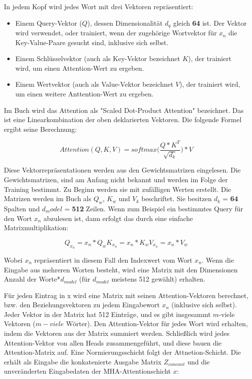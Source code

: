 In jedem Kopf wird jedes Wort mit drei Vektoren repräsentiert:
\begin{itemize}
	\item Einem Query-Vektor ($Q$), dessen Dimensionalität $d_q$ gleich \textbf{64} ist. Der Vektor wird verwendet, oder trainiert, wenn der zugehörige Wortvektor für $x_n$ die Key-Value-Paare gesucht sind, inklusive sich selbst.
	
	\item Einem Schlüsselvektor (auch als Key-Vektor bezeichnet $K$), der trainiert wird, um einen Attention-Wert zu ergeben.
	
	\item Einem Wertvektor (auch als Value-Vektor bezeichnet $V$), der trainiert wird, um einen weitere Anttention-Wert zu ergeben.
\end{itemize}

Im Buch \cite{denis_Transformer:02} wird das Attention als "Scaled Dot-Product Attention" bezeichnet. Das ist eine Linearkombination der oben deklarierten Vektoren. Die folgende Formel ergibt seine Berechnung: 

\begin{equation}
	Attention(Q, K, V) = softmax\Bigg(\frac{Q*K^T}{\sqrt{d_k}}\Bigg)* V
\end{equation}

Diese Vektorrepräsentationen werden aus den Gewichtsmatrizen eingelesen. Die Gewichtsmatrizen, sind am Anfang nicht bekannt und werden im Folge der Training bestimmt. Zu Beginn werden sie mit zufälligen Werten erstellt. Die Matrizen werden im Buch \cite{denis_Transformer:02} als $Q_w$, $K_w$ und $V_k$ beschriftet. Sie besitzen $d_k$ = \textbf{64} Spalten und $d_model$ = \textbf{512} Zeilen. Wenn zum Beispiel ein bestimmtes Query für den Wort $x_n$ abzulesen ist, dann erfolgt das durch eine einfache Matrixmultiplikation:

\begin{equation}
	Q_{x_n} = x_n * Q_w
	K_{x_n} = x_n * K_w
	V_{x_n} = x_n * V_w
\end{equation}

Wobei $x_n$ repräsentiert in diesem Fall den Indexwert vom Wort $x_n$. Wenn die Eingabe aus mehreren Worten besteht, wird eine Matrix mit den Dimensionen Anzahl der Worte*$d_{model}$ (für $d_{model}$ meistens 512 gewählt) erhalten.

Für jeden Eintrag in x wird eine Matrix mit seinen Attention-Vektoren berechnet, bzw. den Beziehungsvektoren zu jedem Eingabewort $x_n$ (inklusive sich selbst). Jeder Vektor in der Matrix hat 512 Einträge, und es gibt insgesammt $m$-viele Vektoren ($m-viele$ Wörter). Den Attention-Vektor für jedes Wort wird erhalten, indem die Vektoren aus der Matrix summiert werden. Schließlich wird jedes Attention-Vektor von allen Heads zusammengeführt, und diese bauen die Attention-Matrix auf. Eine Normierungsschicht folgt der Attnetion-Schicht. Die erhält als Eingabe die konkatenierte Ausgabe Matrix $Z_{concant}$ und die unveränderten Eingabedaten der MHA-Attentionschicht $x$:

